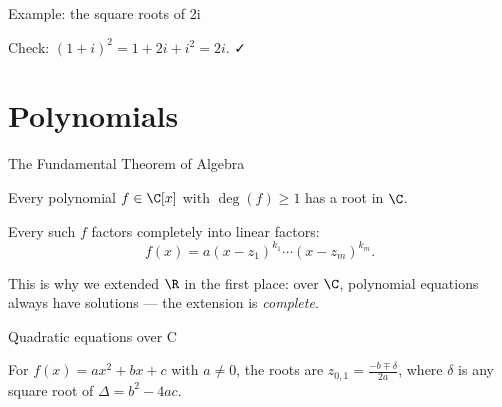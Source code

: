 \begin{frame}{Example: the square roots of 2i}
\begin{steps}
\end{steps}

\pause

Check: $(1+i)^2 = 1 + 2i + i^2 = 2i$. ✓
\end{frame}

\section{Polynomials}

\begin{frame}{The Fundamental Theorem of Algebra}
\begin{theorem}
Every polynomial $f \in \C[x]$ with $\deg(f) \geq 1$ has a root in $\C$.
\end{theorem}

\pause

\begin{corollary}
Every such $f$ factors completely into linear factors:
\[
f(x) = a (x - z_1)^{k_1} \cdots (x - z_m)^{k_m}.
\]
\end{corollary}

\pause

This is why we extended $\R$ in the first place: over $\C$, polynomial
equations always have solutions — the extension is \emph{complete}.
\end{frame}

\begin{frame}{Quadratic equations over C}
\begin{theorem}
For $f(x) = ax^2 + bx + c$ with $a \neq 0$, the roots are
$z_{0,1} = \frac{-b \mp \delta}{2a}$, where $\delta$ is any square root of
$\Delta = b^2 - 4ac$.
\end{theorem}

\pause

\begin{steps}
\end{steps}
\end{frame}

